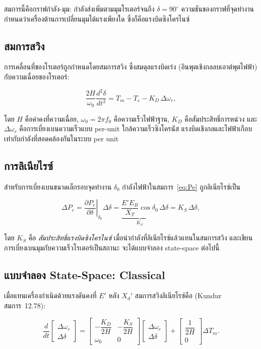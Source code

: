 \documentclass[12pt,a4paper]{article}
\newcommand{\dwr}{\Delta\omega_r}
\newcommand{\ddel}{\Delta\delta}
\begin{document}
สมการนี้คือกราฟกำลัง-มุม: กำลังส่งเพิ่มตามมุมโรเตอร์จนถึง $\delta = 90^\circ$
ความชันของกราฟที่จุดทำงานกำหนดว่าเครื่องต้านการเปลี่ยนมุมได้แรงเพียงใด
ซึ่งก็คือแรงบิดซิงโครไนซ์

\subsection{สมการสวิง}

การเคลื่อนที่ของโรเตอร์ถูกกำหนดโดยสมการสวิง ซึ่งสมดุลแรงบิดเร่ง
(อินพุตเชิงกลลบเอาต์พุตไฟฟ้า) กับความเฉื่อยของโรเตอร์:

\begin{equation}
\frac{2H}{\omega_0}\frac{d^2\delta}{dt^2}
= T_m - T_e - K_D\,\Delta\omega_r,
\label{eq:swing}
\end{equation}

โดย $H$ คือค่าคงที่ความเฉื่อย, $\omega_0 = 2\pi f_0$ คือความเร็วไฟฟ้าฐาน,
$K_D$ คือสัมประสิทธิ์การหน่วง และ $\Delta\omega_r$ คือการเบี่ยงเบนความเร็วแบบ per-unit
ใกล้ความเร็วซิงโครนัส แรงบิดเชิงกลและไฟฟ้าเกือบเท่ากับกำลังที่สอดคล้องกันในระบบ per unit

\subsection{การลิเนียไรซ์}

สำหรับการเบี่ยงเบนขนาดเล็กรอบจุดทำงาน $\delta_0$ กำลังไฟฟ้าในสมการ~\eqref{eq:Pe}
ถูกลิเนียไรซ์เป็น

\begin{equation}
\Delta P_e
= \left.\frac{\partial P_e}{\partial \delta}\right|_{\delta_0}\!\ddel
= \underbrace{\frac{E' E_B}{X_T}\cos\delta_0}_{K_S}\,\ddel
= K_S\,\ddel,
\label{eq:Ks}
\end{equation}

โดย $K_S$ คือ \textit{สัมประสิทธิ์แรงบิดซิงโครไนซ์}
เมื่อนำกำลังที่ลิเนียไรซ์แล้วแทนในสมการสวิง และเขียนการเบี่ยงเบนมุมกับความเร็วโรเตอร์เป็นสถานะ
จะได้แบบจำลอง state-space ต่อไปนี้

\subsection{แบบจำลอง State-Space: Classical}

เมื่อแทนเครื่องกำเนิดด้วยแรงดันคงที่ $E'$ หลัง $X_d'$ สมการสวิงลิเนียไรซ์คือ
(Kundur สมการ~12.78):

\begin{equation}
\frac{d}{dt}
\begin{bmatrix} \dwr \\ \ddel \end{bmatrix}
=
\begin{bmatrix}
-\dfrac{K_D}{2H} & -\dfrac{K_S}{2H} \\[2ex]
\omega_0 & 0
\end{bmatrix}
\begin{bmatrix} \dwr \\ \ddel \end{bmatrix}
+
\begin{bmatrix} \dfrac{1}{2H} \\[2ex] 0 \end{bmatrix}
\Delta T_m.
\label{eq:classA}
\end{equation}
\end{document}
